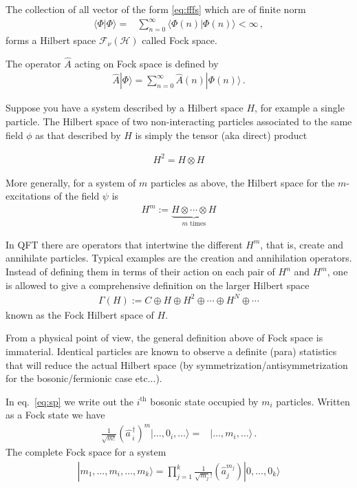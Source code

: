 The collection of all vector of the form \eqref{eq:fffs} which are of finite norm
\begin{align}
  \langle\Phi|\Phi\rangle=&\sum_{n=0}^{\infty}\langle\Phi(n)|\Phi(n)\rangle<\infty\,,
\end{align}
forms a Hilbert space $\mathcal{F}_{\nu}(\mathcal{H})$ called Fock space.

The operator  $\widehat{A}$ acting on Fock space is defined by
\begin{align}
\label{eq:Afi}
  \widehat{A}|\Phi\rangle=\sum_{n=0}^{\infty} \widehat{A}(n)|\Phi(n)\rangle\,.
\end{align}


Suppose you have a system described by a Hilbert space $H$, for example a single particle. The Hilbert space of two non-interacting particles associated to the same field $\phi$ as that described by $H$ is simply the tensor (aka direct) product
\begin{frame}
\begin{align}
  H^2 = H \otimes H
\end{align}

More generally, for a system of $m$ particles as above, the Hilbert space for the $m$-excitations of the field $\psi$ is
\begin{align}
  H^m := \underbrace{H\otimes\cdots\otimes H}_{m\text{ times}}
\end{align}

In QFT there are operators that intertwine the different $H^m$, that is, create and annihilate particles. Typical examples are the creation and annihilation operators. Instead of defining them in terms of their action on each pair of $H^n$ and $H^m$, one is allowed to give a comprehensive definition on the larger Hilbert space
\begin{align}
  \Gamma(H):=C\oplus H\oplus H^2\oplus\cdots\oplus H^N\oplus\cdots
\end{align}
known as the Fock Hilbert space of $H$.
\end{frame}

From a physical point of view, the general definition above of Fock space is immaterial. Identical particles are known to observe a definite (para) statistics that will reduce the actual Hilbert space (by symmetrization/antisymmetrization for the bosonic/fermionic case etc...).

\begin{frame}
In eq.~\eqref{eq:sp} we write out the $i^{\text{th}}$ bosonic state occupied by $m_{i}$ particles. Written as a Fock state we have
\begin{align}
\frac{1}{\sqrt{m!}} \left(\widehat{a\,}_{i}^\dagger\right)^m |\ldots,0_i,\ldots\rangle
=&|\ldots,m_i,\ldots\rangle\,.
\end{align}
The complete Fock space for a system
\begin{align}
  |m_1,\ldots,m_i,\ldots,m_k \rangle =\prod_{j=1}^k \frac{1}{\sqrt{m_j}!}\left( \hat{a}_j^{m_j} \right)
|0,\ldots,0_k \rangle
\end{align}
\end{frame}


